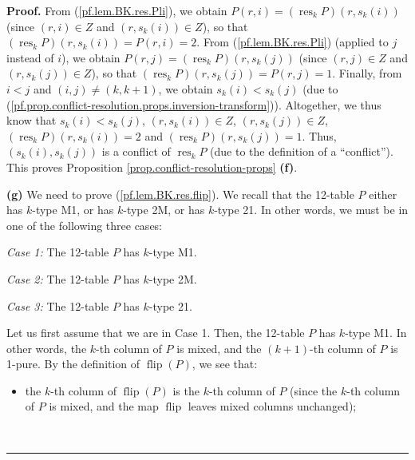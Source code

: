 \documentclass[numbers=enddot,12pt,final,onecolumn,notitlepage]{scrartcl}%
\theoremstyle{definition}
\newenvironment{proof}[1][Proof]{\noindent\textbf{#1.} }{\ \rule{0.5em}{0.5em}}
\begin{document}
\begin{proof}
From (\ref{pf.lem.BK.res.Pli}), we obtain $P\left(  r,i\right)  =\left(
\operatorname*{res}\nolimits_{k}P\right)  \left(  r,s_{k}\left(  i\right)
\right)  $ (since $\left(  r,i\right)  \in Z$ and $\left(  r,s_{k}\left(
i\right)  \right)  \in Z$), so that $\left(  \operatorname*{res}%
\nolimits_{k}P\right)  \left(  r,s_{k}\left(  i\right)  \right)  =P\left(
r,i\right)  =2$. From (\ref{pf.lem.BK.res.Pli}) (applied to $j$ instead of
$i$), we obtain $P\left(  r,j\right)  =\left(  \operatorname*{res}%
\nolimits_{k}P\right)  \left(  r,s_{k}\left(  j\right)  \right)  $ (since
$\left(  r,j\right)  \in Z$ and $\left(  r,s_{k}\left(  j\right)  \right)  \in
Z$), so that $\left(  \operatorname*{res}\nolimits_{k}P\right)  \left(
r,s_{k}\left(  j\right)  \right)  =P\left(  r,j\right)  =1$. Finally, from
$i<j$ and $\left(  i,j\right)  \neq\left(  k,k+1\right)  $, we obtain
$s_{k}\left(  i\right)  <s_{k}\left(  j\right)  $ (due to
(\ref{pf.prop.conflict-resolution.props.inversion-transform})). Altogether, we
thus know that $s_{k}\left(  i\right)  <s_{k}\left(  j\right)  $, $\left(
r,s_{k}\left(  i\right)  \right)  \in Z$, $\left(  r,s_{k}\left(  j\right)
\right)  \in Z$, $\left(  \operatorname*{res}\nolimits_{k}P\right)  \left(
r,s_{k}\left(  i\right)  \right)  =2$ and $\left(  \operatorname*{res}%
\nolimits_{k}P\right)  \left(  r,s_{k}\left(  j\right)  \right)  =1$. Thus,
$\left(  s_{k}\left(  i\right)  ,s_{k}\left(  j\right)  \right)  $ is a
conflict of $\operatorname*{res}\nolimits_{k}P$ (due to the definition of a
\textquotedblleft conflict\textquotedblright). This proves Proposition
\ref{prop.conflict-resolution-props} \textbf{(f)}.

\textbf{(g)} We need to prove (\ref{pf.lem.BK.res.flip}). We recall that the
12-table $P$ either has $k$-type M1, or has $k$-type 2M, or has $k$-type 21.
In other words, we must be in one of the following three cases:

\textit{Case 1:} The 12-table $P$ has $k$-type M1.

\textit{Case 2:} The 12-table $P$ has $k$-type 2M.

\textit{Case 3:} The 12-table $P$ has $k$-type 21.

Let us first assume that we are in Case 1. Then, the 12-table $P$ has $k$-type
M1. In other words, the $k$-th column of $P$ is mixed, and the $\left(
k+1\right)  $-th column of $P$ is 1-pure. By the definition of
$\operatorname*{flip}\left(  P\right)  $, we see that:

\begin{itemize}
\item the $k$-th column of $\operatorname*{flip}\left(  P\right)  $ is the
$k$-th column of $P$ (since the $k$-th column of $P$ is mixed, and the map
$\operatorname*{flip}$ leaves mixed columns unchanged);


\end{itemize}
\end{proof}
\end{document}

